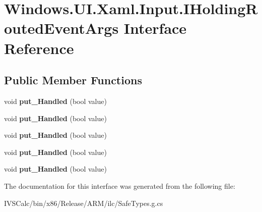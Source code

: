 \hypertarget{interface_windows_1_1_u_i_1_1_xaml_1_1_input_1_1_i_holding_routed_event_args}{}\section{Windows.\+U\+I.\+Xaml.\+Input.\+I\+Holding\+Routed\+Event\+Args Interface Reference}
\label{interface_windows_1_1_u_i_1_1_xaml_1_1_input_1_1_i_holding_routed_event_args}
\subsection*{Public Member Functions}
\begin{DoxyCompactItemize}
\item 
\mbox{\label{interface_windows_1_1_u_i_1_1_xaml_1_1_input_1_1_i_holding_routed_event_args_a371e4f09d547c1acfd50754a4c0ee957}} 
void {\bfseries put\+\_\+\+Handled} (bool value)
\item 
\mbox{\label{interface_windows_1_1_u_i_1_1_xaml_1_1_input_1_1_i_holding_routed_event_args_a371e4f09d547c1acfd50754a4c0ee957}} 
void {\bfseries put\+\_\+\+Handled} (bool value)
\item 
\mbox{\label{interface_windows_1_1_u_i_1_1_xaml_1_1_input_1_1_i_holding_routed_event_args_a371e4f09d547c1acfd50754a4c0ee957}} 
void {\bfseries put\+\_\+\+Handled} (bool value)
\item 
\mbox{\label{interface_windows_1_1_u_i_1_1_xaml_1_1_input_1_1_i_holding_routed_event_args_a371e4f09d547c1acfd50754a4c0ee957}} 
void {\bfseries put\+\_\+\+Handled} (bool value)
\item 
\mbox{\label{interface_windows_1_1_u_i_1_1_xaml_1_1_input_1_1_i_holding_routed_event_args_a371e4f09d547c1acfd50754a4c0ee957}} 
void {\bfseries put\+\_\+\+Handled} (bool value)
\end{DoxyCompactItemize}


The documentation for this interface was generated from the following file\+:\begin{DoxyCompactItemize}
\item 
I\+V\+S\+Calc/bin/x86/\+Release/\+A\+R\+M/ilc/Safe\+Types.\+g.\+cs\end{DoxyCompactItemize}
